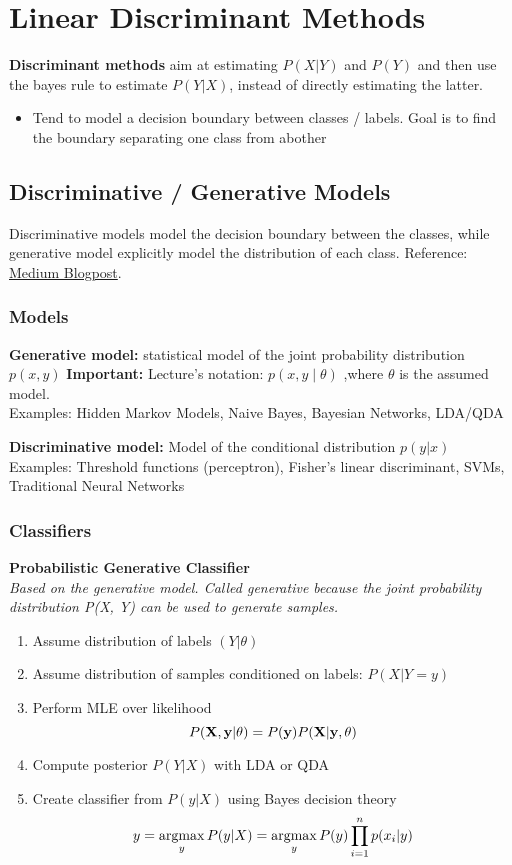 \section{Linear Discriminant Methods}
\textbf{Discriminant methods} aim at estimating $P(X|Y)$ and $P(Y)$ and then use the bayes rule to estimate $P(Y|X)$, instead of directly estimating the latter.
\begin{itemize}
	\item Tend to model a decision boundary between classes / labels. Goal is to find the boundary separating one class from abother
\end{itemize}



\subsection{Discriminative / Generative Models}
Discriminative models model the decision boundary between the classes, while generative model explicitly model the distribution of each class. Reference: \href{https://medium.com/@mlengineer/generative-and-discriminative-models-af5637a66a3}{Medium Blogpost}. 
\subsubsection{Models}
\textbf{Generative model: }statistical model of the joint probability distribution $p(x, y)$ 	\textbf{Important: } Lecture's notation: $p(x, y\mid \theta)$ ,where $\theta$ is the assumed model. \\
	Examples: Hidden Markov Models,  Naive Bayes, Bayesian Networks, LDA/QDA
	
\vspace{1em}
 \textbf{Discriminative model: } Model of the conditional distribution $p(y|x)$ 
		Examples: Threshold functions (perceptron), Fisher's linear discriminant, SVMs, Traditional Neural Networks

\subsubsection{Classifiers}
\textbf{Probabilistic Generative Classifier}\\
\textit{Based on the generative model. Called generative because the joint probability distribution P(X, Y) can be used to generate samples.}
\begin{enumerate}
	\item Assume distribution of labels $(Y|\theta)$
	\item Assume distribution of samples conditioned on labels: $P(X|Y=y)$
	\item Perform MLE over likelihood 
	\begin{equation*}
		P(\mathbf X, \mathbf y|\theta) = P(\mathbf y)P(\mathbf X|\mathbf y, \theta)
	\end{equation*}
	\item Compute posterior $P(Y|X)$ with LDA or QDA
	\item Create classifier from $P(y|X)$ using Bayes decision theory
	\begin{equation*}
		y = \mathop{\mathrm{argmax}}_y P(y|X) = \mathop{\mathrm{argmax}}_y P(y)\prod_{i=1}^n p(x_i|y)
	\end{equation*}
\end{enumerate}

